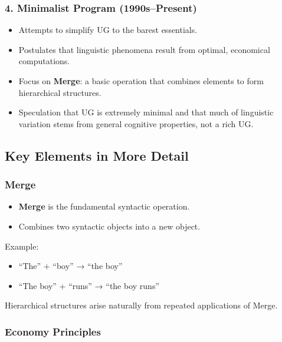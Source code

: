 \documentclass[12pt]{article}
\newcommand{\tightlist}{\itemsep 0pt\parskip 0pt\parsep 0pt}
\begin{document}
\hypertarget{minimalist-program-1990spresent}{%
\subsubsection{\texorpdfstring{4. \textbf{Minimalist Program
(1990s--Present)}}{4. Minimalist Program (1990s--Present)}}\label{minimalist-program-1990spresent}}

\begin{itemize}
\tightlist
\item
  Attempts to simplify UG to the barest essentials.
\item
  Postulates that linguistic phenomena result from optimal, economical
  computations.
\item
  Focus on \textbf{Merge}: a basic operation that combines elements to
  form hierarchical structures.
\item
  Speculation that UG is extremely minimal and that much of linguistic
  variation stems from general cognitive properties, not a rich UG.
\end{itemize}

\hypertarget{key-elements-in-more-detail}{%
\subsection{Key Elements in More
Detail}\label{key-elements-in-more-detail}}

\hypertarget{merge}{%
\subsubsection{Merge}\label{merge}}

\begin{itemize}
\tightlist
\item
  \textbf{Merge} is the fundamental syntactic operation.
\item
  Combines two syntactic objects into a new object.
\end{itemize}

Example:

\begin{itemize}
\tightlist
\item
  ``The'' + ``boy'' → ``the boy''
\item
  ``The boy'' + ``runs'' → ``the boy runs''
\end{itemize}

Hierarchical structures arise naturally from repeated applications of
Merge.

\hypertarget{economy-principles}{%
\subsubsection{Economy Principles}\label{economy-principles}}
\end{document}
